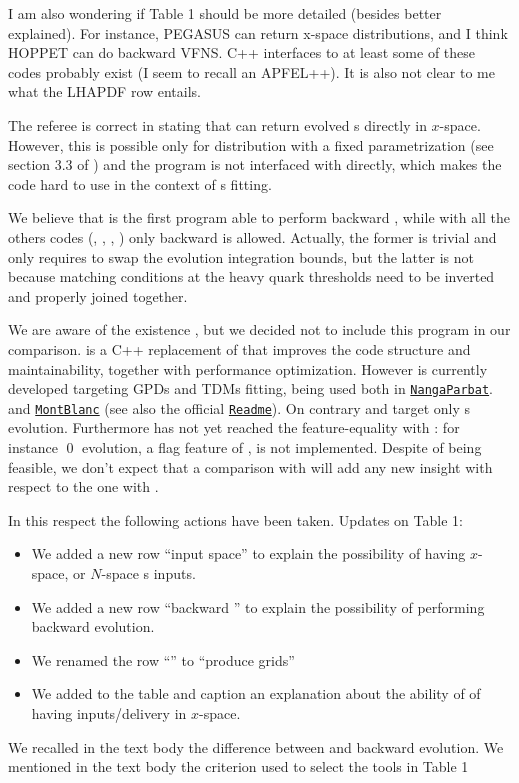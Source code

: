 \documentclass[a4paper,11pt]{article}
\begin{document}
\begin{response}{I am also wondering if Table 1 should be more detailed (besides better
explained). For instance, PEGASUS can return x-space distributions, and I think
HOPPET can do backward VFNS. C++ interfaces to at least some of these codes
probably exist (I seem to recall an APFEL++). It is also not clear to me what
the LHAPDF row entails.}

The referee is correct in stating that \pegasus{} can return evolved \pdf{}s directly in 
$x$-space. However, this is possible only for distribution with a fixed parametrization
(see section 3.3 of \cite{Vogt:2004ns}) and the program is not interfaced with \lhapdf{} 
directly, which makes the code hard to use in the context of \pdf{}s fitting.

We believe that \eko{} is the first program able to perform backward \vfns{}, while
with all the others codes (\apfel{}, \qcdnum{}, \pegasus{}, \hoppet{}) only backward \ffns{}
is allowed. Actually, the former is trivial and only requires to swap the
evolution integration bounds, but the latter is not because matching conditions at 
the heavy quark thresholds need to be inverted and properly joined together.

We are aware of the existence \apfelpp{}, but we decided not to include this program
in our comparison. \apfelpp{} is a C++ replacement of \apfel{}
that improves the code structure and maintainability, 
together with performance optimization.
However is currently developed targeting GPDs and TDMs fitting, being used both in 
\href{https://github.com/MapCollaboration/NangaParbat}{\texttt{NangaParbat}}. 
and \href{https://github.com/MapCollaboration/MontBlanc}{\texttt{MontBlanc}}
(see also the official \apfelpp{} \href{https://github.com/vbertone/apfelxx}{\texttt{Readme}}).
On contrary \apfel{} and \eko{} target only \pdf{}s evolution.
Furthermore \apfelpp{} has not yet reached the feature-equality with \apfel{}:
for instance \qed{} evolution, a flag feature of \apfel{}, is not implemented. 
Despite of being feasible, we don't expect that a comparison with \apfelpp{}
will add any new insight with respect to the one with \apfel{}.

In this respect the following actions have been taken. Updates on Table 1: 
\begin{itemize}
 \item We added a new row \enquote{input space} to explain the possibility of
 having $x$-space, or $N$-space \pdf{}s inputs.
 \item We added a new row \enquote{backward \ffns{}} to explain the possibility of
 performing \ffns{} backward evolution.
 \item We renamed the row \enquote{\lhapdf{}} to \enquote{produce \lhapdf{} grids}
 \item We added to the table and caption an explanation about the ability of \pegasus{} 
 of having inputs/delivery in $x$-space.
\end{itemize}
We recalled in the text body the difference between \ffns{} and \vfns{} backward evolution.
We mentioned in the text body the criterion used to select the tools in Table 1
\end{response}
\end{document}

